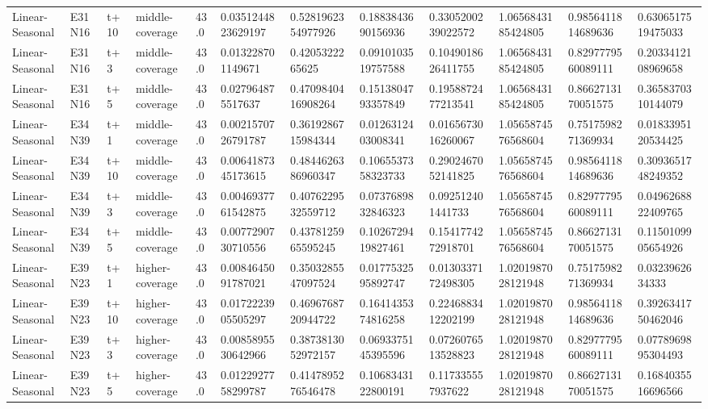 \begin{landscape}
\begin{longtable}{llllllllllll}
Linear-Seasonal & E31N16 & t+10 & middle-coverage & 43.0 & 0.0351244823629197 & 0.5281962354977926 & 0.1883843690156936 & 0.3305200239022572 & 1.0656843185424805 & 0.9856411814689636 & 0.6306517519475033 \\
Linear-Seasonal & E31N16 & t+3 & middle-coverage & 43.0 & 0.013228701149671 & 0.4205322265625 & 0.0910103519757588 & 0.1049018626411755 & 1.0656843185424805 & 0.8297779560089111 & 0.2033412108969658 \\
Linear-Seasonal & E31N16 & t+5 & middle-coverage & 43.0 & 0.027964875517637 & 0.4709840416908264 & 0.1513804793357849 & 0.1958872477213541 & 1.0656843185424805 & 0.8662713170051575 & 0.3658370310144079 \\
Linear-Seasonal & E34N39 & t+1 & middle-coverage & 43.0 & 0.0021570726791787 & 0.3619286715984344 & 0.0126312403008341 & 0.0165673016260067 & 1.0565874576568604 & 0.7517598271369934 & 0.0183395120534425 \\
Linear-Seasonal & E34N39 & t+10 & middle-coverage & 43.0 & 0.0064187345173615 & 0.4844626386960347 & 0.1065537358323733 & 0.2902467052141825 & 1.0565874576568604 & 0.9856411814689636 & 0.3093651748249352 \\
Linear-Seasonal & E34N39 & t+3 & middle-coverage & 43.0 & 0.0046937761542875 & 0.4076229532559712 & 0.0737689832846323 & 0.092512401441733 & 1.0565874576568604 & 0.8297779560089111 & 0.0496268822409765 \\
Linear-Seasonal & E34N39 & t+5 & middle-coverage & 43.0 & 0.0077290730710556 & 0.4378125965595245 & 0.1026729419827461 & 0.1541774272918701 & 1.0565874576568604 & 0.8662713170051575 & 0.1150109905654926 \\
Linear-Seasonal & E39N23 & t+1 & higher-coverage & 43.0 & 0.0084645091787021 & 0.3503285547097524 & 0.0177532595892747 & 0.0130337172498305 & 1.0201987028121948 & 0.7517598271369934 & 0.0323962634333 \\
Linear-Seasonal & E39N23 & t+10 & higher-coverage & 43.0 & 0.0172223905505297 & 0.4696768720944722 & 0.1641435374816258 & 0.2246883412202199 & 1.0201987028121948 & 0.9856411814689636 & 0.3926341750462046 \\
Linear-Seasonal & E39N23 & t+3 & higher-coverage & 43.0 & 0.0085895530642966 & 0.3873813052972157 & 0.0693375145395596 & 0.0726076513528823 & 1.0201987028121948 & 0.8297779560089111 & 0.0778969895304493 \\
Linear-Seasonal & E39N23 & t+5 & higher-coverage & 43.0 & 0.0122927758299787 & 0.4147895276546478 & 0.1068343122800191 & 0.117335557937622 & 1.0201987028121948 & 0.8662713170051575 & 0.1684035516696566 \\

\end{longtable}
\end{landscape}
